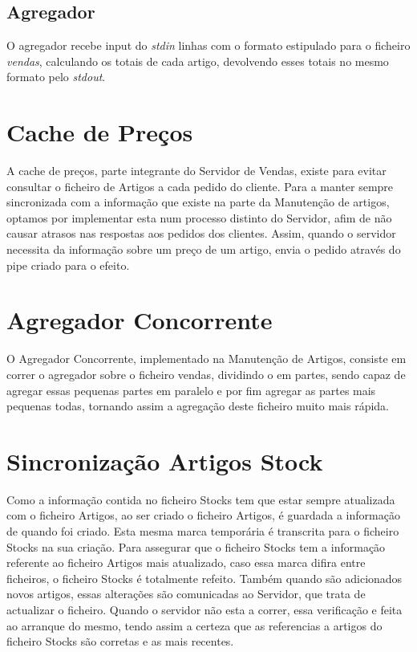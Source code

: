 \documentclass[a4paper]{report}
\begin{document}
\section{Agregador}

O agregador recebe input do \textit{stdin} linhas com o formato estipulado
para o ficheiro \textit{vendas}, calculando os totais de cada artigo,
devolvendo esses totais no mesmo formato pelo \textit{stdout}.

\chapter{Cache de Preços}

A cache de preços, parte integrante do Servidor de Vendas, existe para
evitar consultar o ficheiro de Artigos a cada pedido do cliente.
Para a manter sempre sincronizada com a informação que existe na parte da
Manutenção de artigos, optamos por implementar esta num processo distinto
do Servidor, afim de não causar atrasos nas respostas aos pedidos dos clientes.
Assim, quando o servidor necessita da informação sobre um preço de um artigo,
envia o pedido através do pipe criado para o efeito.

\chapter{Agregador Concorrente}

O Agregador Concorrente, implementado na Manutenção de Artigos, consiste
em correr o agregador sobre o ficheiro vendas, dividindo o em partes, sendo
capaz de agregar essas pequenas partes em paralelo e por fim agregar as 
partes mais pequenas todas, tornando assim a agregação deste ficheiro muito
mais rápida.

\chapter{Sincronização Artigos Stock}

Como a informação contida no ficheiro Stocks tem que estar sempre atualizada
com o ficheiro Artigos, ao ser criado o ficheiro Artigos, é guardada a 
informação de quando foi criado. Esta mesma marca temporária é transcrita para
o ficheiro Stocks na sua criação. Para assegurar que o ficheiro Stocks
tem a informação referente ao ficheiro Artigos mais atualizado, caso essa marca
difira entre ficheiros, o ficheiro Stocks é totalmente refeito. Também quando são
adicionados novos artigos, essas alterações são comunicadas ao Servidor, que trata
de actualizar o ficheiro. Quando o servidor não esta a correr, essa verificação
e feita ao arranque do mesmo, tendo assim a certeza que as referencias a artigos
do ficheiro Stocks são corretas e as mais recentes.
\end{document}
